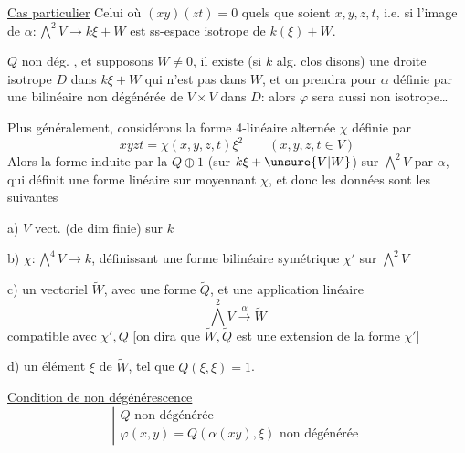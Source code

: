\uline{Cas particulier} Celui où $(xy)(zt)=0$ quels que soient $x,y,z,t$, i.e.
\margin{[i.e. $(H^1)\unsure{H^3|(H^1)^3}=0$ dans $H^4$ !]}
si l'image de $\alpha:\bigwedge^2V\longrightarrow k\xi+W$ est   ss-espace isotrope de $k(\xi)+W$.

$Q$ non dég. , et supposons $W\neq0$, il existe (si $k$  alg. clos disons) une droite isotrope $D$ dans $k\xi+W$ qui n'est pas dans $W$, et on prendra pour $\alpha$  définie par une  bilinéaire  non dégénérée  de $V\times V$ dans $D$: alors $\varphi$ sera aussi non isotrope\ldots


Plus généralement, considérons la forme 4-linéaire alternée $\chi$ définie par
\[
xyzt=\chi(x,y,z,t)\xi^2\qquad(x,y,z,t\in V)
\]
Alors la forme  induite par la  $Q\oplus1$ (sur $k\xi+\unsure{V|W}$) sur $\bigwedge^2 V$ par $\alpha$, qui définit une  forme linéaire sur
moyennant $\chi$, et donc les données sont les suivantes

a) $V$ vect. (de dim finie) sur $k$


b) $\chi:\bigwedge^4V\longrightarrow k$, définissant une forme bilinéaire symétrique $\chi'$ sur $\bigwedge^2V$

c) un vectoriel $\widetilde W$, avec une forme  $\widetilde Q$, et une application linéaire
\[
\bigwedge^2V\xrightarrow{\alpha}\widetilde W
\]
compatible avec $\chi',Q$ [on dira que $\widetilde W,\widetilde Q$ est une \uline{extension} de la forme $\chi'$]

d) un élément $\xi$ de $\widetilde W$, tel que $Q(\xi,\xi)=1$.

\uline{Condition de non dégénérescence}
\[
\left|\begin{array}{l}
Q\text{ non dégénérée}\\
\varphi(x,y)=Q(\alpha(xy),\xi)\text{ non dégénérée}
\end{array}\right.
\]
